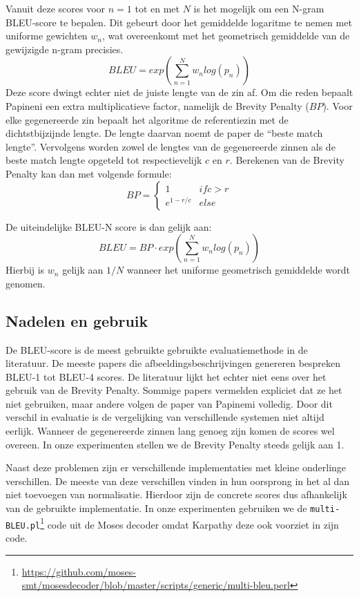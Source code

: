Vanuit deze scores voor $n=1$ tot en met $N$ is het mogelijk om een N-gram BLEU-score te bepalen. Dit gebeurt door het gemiddelde logaritme te nemen met uniforme gewichten $w_n$, wat overeenkomt met het geometrisch gemiddelde van de gewijzigde n-gram precisies.
\begin{equation}
BLEU = exp(\sum\limits_{n=1}^N w_nlog(p_n))
\end{equation}
Deze score dwingt echter niet de juiste lengte van de zin af. Om die reden bepaalt Papineni een extra multiplicatieve factor, namelijk de Brevity Penalty ($BP$). Voor elke gegenereerde zin bepaalt het algoritme de referentiezin met de dichtstbijzijnde lengte. De lengte daarvan noemt de paper de ``beste match lengte''. Vervolgens worden zowel de lengtes van de gegenereerde zinnen als de beste match lengte opgeteld tot respectievelijk $c$ en $r$. Berekenen van de Brevity Penalty kan dan met volgende formule:
\begin{equation}BP=
 \begin{cases}
1 & if c > r \\
e^{1-r/c} & else
\end{cases}
\end{equation}

De uiteindelijke BLEU-N score is dan gelijk aan:
\begin{equation}
BLEU = BP\cdot exp(\sum\limits_{n=1}^N w_nlog(p_n))
\end{equation}
Hierbij is $w_n$ gelijk aan $1/N$ wanneer het uniforme geometrisch gemiddelde wordt genomen.

\subsection{Nadelen en gebruik}
De BLEU-score is de meest gebruikte gebruikte evaluatiemethode in de literatuur. De meeste papers die afbeeldingsbeschrijvingen genereren bespreken BLEU-1 tot BLEU-4 scores. De literatuur lijkt het echter niet eens over het gebruik van de Brevity Penalty. Sommige papers vermelden expliciet dat ze het niet gebruiken, maar andere volgen de paper van Papinemi volledig. Door dit verschil in evaluatie is de vergelijking van verschillende systemen niet altijd eerlijk. Wanneer de gegenereerde zinnen lang genoeg zijn komen de scores wel overeen.
In onze experimenten stellen we de Brevity Penalty steeds gelijk aan 1.

Naast deze problemen zijn er verschillende implementaties met kleine onderlinge verschillen. De meeste van deze verschillen vinden in hun oorsprong in het al dan niet toevoegen van normalisatie. Hierdoor zijn de concrete scores dus afhankelijk van de gebruikte implementatie. In onze experimenten gebruiken we de \texttt{multi-BLEU.pl}\footnote{\url{https://github.com/moses-smt/mosesdecoder/blob/master/scripts/generic/multi-bleu.perl}} code uit de Moses decoder\cite{Koehn2006} omdat Karpathy deze ook voorziet in zijn code.


